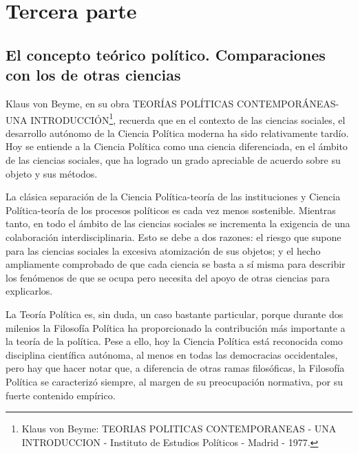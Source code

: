 \documentclass[
]{book}
\begin{document}
\hypertarget{tercera-parte}{%
\section*{Tercera parte}\label{tercera-parte}}

\hypertarget{el-concepto-teuxf3rico-poluxedtico.-comparaciones-con-los-de-otras-ciencias}{%
\subsection*{El concepto teórico político. Comparaciones con los de otras ciencias}\label{el-concepto-teuxf3rico-poluxedtico.-comparaciones-con-los-de-otras-ciencias}}

Klaus von Beyme, en su obra TEORÍAS POLÍTICAS CONTEMPORÁNEAS-UNA INTRODUCCIÓN\footnote{Klaus von Beyme: TEORIAS POLITICAS CONTEMPORANEAS - UNA INTRODUCCION - Instituto de Estudios Políticos - Madrid - 1977.}, recuerda que en el contexto de las ciencias sociales, el desarrollo autónomo de la Ciencia Política moderna ha sido relativamente tardío. Hoy se entiende a la Ciencia Política como una ciencia diferenciada, en el ámbito de las ciencias sociales, que ha logrado un grado apreciable de acuerdo sobre su objeto y sus métodos.

La clásica separación de la Ciencia Política-teoría de las instituciones y Ciencia Política-teoría de los procesos políticos es cada vez menos sostenible. Mientras tanto, en todo el ámbito de las ciencias sociales se incrementa la exigencia de una colaboración interdisciplinaria. Esto se debe a dos razones: el riesgo que supone para las ciencias sociales la excesiva atomización de sus objetos; y el hecho ampliamente comprobado de que cada ciencia se basta a sí misma para describir los fenómenos de que se ocupa pero necesita del apoyo de otras ciencias para explicarlos.

La Teoría Política es, sin duda, un caso bastante particular, porque durante dos milenios la Filosofía Política ha proporcionado la contribución más importante a la teoría de la política. Pese a ello, hoy la Ciencia Política está reconocida como disciplina científica autónoma, al menos en todas las democracias occidentales, pero hay que hacer notar que, a diferencia de otras ramas filosóficas, la Filosofía Política se caracterizó siempre, al margen de su preocupación normativa, por su fuerte contenido empírico.
\end{document}
